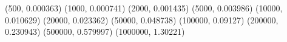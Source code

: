(500, 0.000363) (1000, 0.000741) (2000, 0.001435) (5000, 0.003986) (10000, 0.010629) (20000, 0.023362) (50000, 0.048738) (100000, 0.09127) (200000, 0.230943) (500000, 0.579997) (1000000, 1.30221) 
